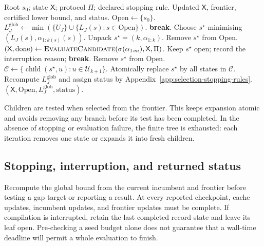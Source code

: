 \documentclass[a4paper,onecolumn,11pt,unpublished]{quantumarticle}
\theoremstyle{remark}
\begin{document}
\begin{algorithm}[H]
\caption{Anytime branch-and-bound certification}
\label{alg:app-branch-and-bound}
\begin{algorithmic}[1]
\Require Root $s_0$; state $\mathsf X$; protocol $\Pi$; declared stopping rule.
\Ensure Updated $\mathsf X$, frontier, certified lower bound, and status.
\State $\mathrm{Open}\gets\{s_0\}$.
\Loop
    \State $L_J^{\mathrm{glob}}\gets
    \min(\{U_J\}\cup\{L_J(s):s\in\mathrm{Open}\})$.
        \State \textbf{break}.
    \EndIf
    \State Choose $s^\star$ minimising $(L_J(s),\alpha_{1:k(s)}(s))$.
    \State Unpack $s^\star=(k,\alpha_{1:k})$.
        \State Remove $s^\star$ from $\mathrm{Open}$.
        \State $(\mathsf X,\mathrm{done})\gets
        \Call{EvaluateCandidate}{\sigma(\alpha_{1:m}),\mathsf X,\Pi}$.
            \State Keep $s^\star$ open; record the interruption reason; \textbf{break}.
        \EndIf
        \State Remove $s^\star$ from $\mathrm{Open}$.
    \Else
        \State $\mathcal C\gets\{\operatorname{child}(s^\star,u):u\in\mathcal U_{k+1}\}$.
        \State Atomically replace $s^\star$ by all states in $\mathcal C$.
    \EndIf
\EndLoop
\State Recompute $L_J^{\mathrm{glob}}$ and assign status by
Appendix~\ref{app:selection-stopping-rules}.
\State \Return $(\mathsf X,\mathrm{Open},L_J^{\mathrm{glob}},\mathrm{status})$.
\end{algorithmic}
\end{algorithm}

Children are tested when selected from the frontier.  This keeps expansion
atomic and avoids removing any branch before its test has been completed.
In the absence of stopping or evaluation failure, the finite tree is
exhausted: each iteration removes one state or expands it into fresh children.

\subsection{Stopping, interruption, and returned status}
\label{app:selection-implementation}
\label{app:selection-stopping-rules}

Recompute the global bound from the current incumbent and frontier before
testing a gap target or reporting a result.  At every reported checkpoint,
cache updates, incumbent updates, and frontier updates must be complete.
If compilation is interrupted, retain the last completed record state and
leave its leaf open.  Pre-checking a seed budget alone does not guarantee that
a wall-time deadline will permit a whole evaluation to finish.
\end{document}
